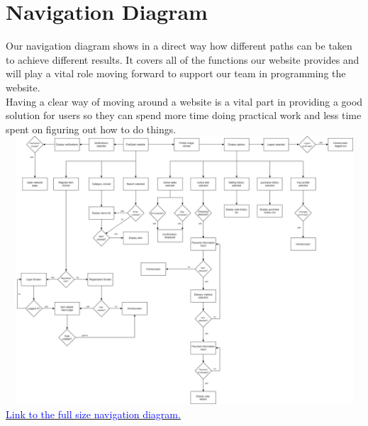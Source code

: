 \section{Navigation Diagram}

Our navigation diagram shows in a direct way how different paths can be taken to achieve different results. It covers all of the functions our website provides and will play a vital role moving forward to support our team in programming the website.\\

Having a clear way of moving around a website is a vital part in providing a good solution for users so they can spend more time doing practical work and less time spent on figuring out how to do things.\\

\includegraphics[width=150mm, height=100mm]{Images/NavigationDiagram/NavDiagram.png}\\
\href{https://tinyurl.com/NavigationDiagram}{\textcolor{blue}{Link to the full size navigation diagram.}}
\\\\